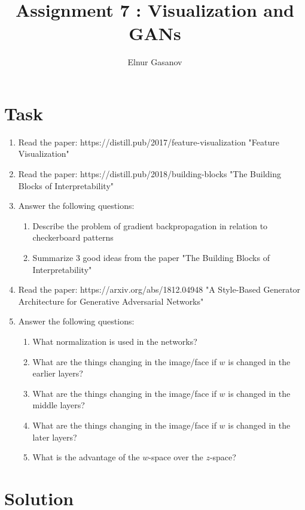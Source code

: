 \documentclass{article}
\author{Elnur Gasanov}
\title{Assignment 7 : Visualization and GANs}
\date{}
\begin{document}
\maketitle

\section{Task}

\begin{enumerate}
	\item Read the paper: https://distill.pub/2017/feature-visualization "Feature Visualization"
	\item Read the paper: https://distill.pub/2018/building-blocks "The Building Blocks of Interpretability"
	\item Answer the following questions: 
		\begin{enumerate}
			\item Describe the problem of gradient backpropagation in relation to checkerboard patterns
			\item Summarize 3 good ideas from the paper "The Building Blocks of Interpretability"
		\end{enumerate}
	\item Read the paper: https://arxiv.org/abs/1812.04948 "A Style-Based Generator Architecture for Generative Adversarial Networks"
	\item Answer the following questions:
		\begin{enumerate}
			\item What normalization is used in the networks?
			\item What are the things changing in the image/face if $w$ is changed in the earlier layers?
			\item What are the things changing in the image/face if $w$ is changed in the middle layers?
			\item What are the things changing in the image/face if $w$ is changed in the later layers?
			\item What is the advantage of the $w$-space over the $z$-space?
		\end{enumerate}
\end{enumerate}

\section{Solution}
\end{document}

